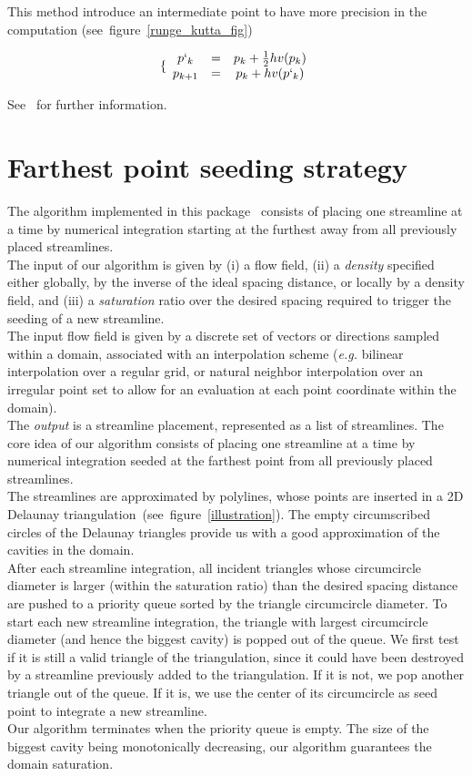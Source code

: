 This method introduce an intermediate point  to have more precision in the computation (see~figure~\ref{runge_kutta_fig})

$$\{ \begin{array}{ccc} p`_k & = & p_k + \frac{1}{2}hv(p_k) \\ p_{k+1} & = & p_k + hv(p`_k) \end{array}$$

See~\cite{cgal:ptvf-nrcpp-02} for further information.


\section{Farthest point seeding strategy}
\label{Section_2D_Streamlines_Strategy}
The algorithm implemented in this package~\cite{cgal:mad-fpsep-05} consists of
placing one streamline at
a time by numerical integration starting at the furthest away from all
previously placed streamlines.\\The input of our algorithm is given by
(i) a flow field, (ii) a \textit{density} specified either globally, by the
inverse of the ideal spacing distance, or locally by a density field, and (iii)
a \textit{saturation} ratio over the desired spacing required to trigger the
seeding of a new streamline.\\The input flow field is given by a discrete set of
vectors or directions sampled within a domain, associated with an interpolation
scheme (\textit{e.g.} bilinear interpolation over a regular grid, or natural
neighbor interpolation over an irregular point set to
allow for an evaluation at each point coordinate within the domain).\\The
\textit{output} is a streamline placement, represented as a list of streamlines.
The core idea of our algorithm consists of placing one streamline at a time by
numerical integration seeded at the farthest point from all previously placed
streamlines.\\The streamlines are approximated by polylines, whose points are
inserted in a 2D Delaunay triangulation~(see~figure~\ref{illustration}). The empty circumscribed circles of the
Delaunay triangles provide us with a good approximation of the cavities in the
domain.\\After each streamline integration, all incident triangles whose circumcircle
 diameter is larger (within the saturation ratio) than the desired
spacing distance are pushed to a priority queue sorted by the triangle
circumcircle diameter. To start each new streamline integration, the triangle
with largest circumcircle diameter (and hence the biggest cavity) is popped out
of the queue. We first test if it is still a valid triangle of the
triangulation, since it could have been destroyed by a streamline previously
added to the triangulation. If it is not, we pop another triangle out of the
queue. If it is, we use the center of its circumcircle as seed point to
integrate a new streamline.\\Our algorithm terminates when the priority queue is empty. The size
of the biggest cavity being monotonically decreasing, our algorithm guarantees
the domain saturation.

